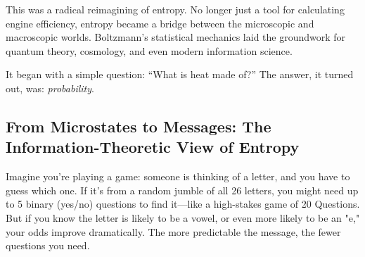 This was a radical reimagining of entropy. No longer just a tool for calculating engine efficiency, entropy became a bridge between the microscopic and macroscopic worlds. Boltzmann’s statistical mechanics laid the groundwork for quantum theory, cosmology, and even modern information science.

It began with a simple question: “What is heat made of?”  
The answer, it turned out, was: \emph{probability}.


\subsection{From Microstates to Messages: The Information-Theoretic View of Entropy}

Imagine you’re playing a game: someone is thinking of a letter, and you have to guess which one. If it’s from a random jumble of all 26 letters, you might need up to 5 binary (yes/no) questions to find it—like a high-stakes game of 20 Questions. But if you know the letter is likely to be a vowel, or even more likely to be an "e," your odds improve dramatically. The more predictable the message, the fewer questions you need.




